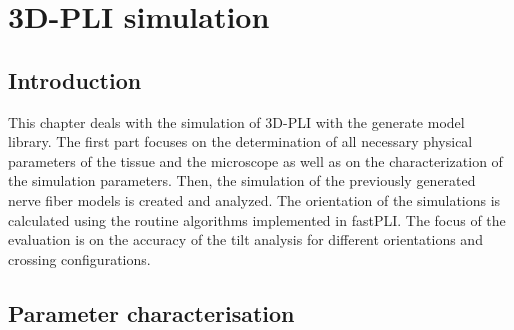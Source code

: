 \cleardoublepage
\setcounter{chapter}{8}
\chapter{3D-PLI simulation}
\label{cha:simulation_analysis}
%
\section{Introduction}
%
This chapter deals with the simulation of \ac{3D-PLI} with the generate model library.
The first part focuses on the determination of all necessary physical parameters of the tissue and the microscope as well as on the characterization of the simulation parameters.
Then, the simulation of the previously generated nerve fiber models is created and analyzed.
The orientation of the simulations is calculated using the routine algorithms implemented in \ac{fastPLI}.
The focus of the evaluation is on the accuracy of the tilt analysis for different orientations and crossing configurations.
%
%
%
\section{Parameter characterisation}\label{sec:sim_choose_parameters}
%
